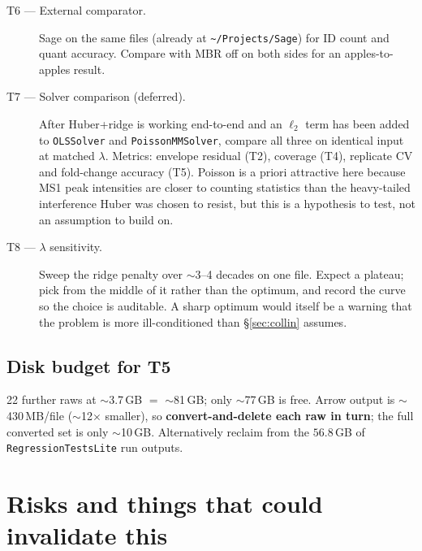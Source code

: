 \documentclass[11pt]{article}
\newcommand{\code}[1]{\texttt{\small #1}}
\begin{document}
\begin{description}
  \item[T6 --- External comparator.] Sage on the same files (already at
        \code{\textasciitilde/Projects/Sage}) for ID count and quant accuracy. Compare with MBR
        off on both sides for an apples-to-apples result.

  \item[T7 --- Solver comparison (deferred).] After Huber+ridge is working end-to-end and an
        $\ell_2$ term has been added to \code{OLSSolver} and \code{PoissonMMSolver}, compare all
        three on identical input at matched $\lambda$. Metrics: envelope residual (T2), coverage
        (T4), replicate CV and fold-change accuracy (T5). Poisson is a priori attractive here
        because MS1 peak intensities are closer to counting statistics than the heavy-tailed
        interference Huber was chosen to resist, but this is a hypothesis to test, not an
        assumption to build on.

  \item[T8 --- $\lambda$ sensitivity.] Sweep the ridge penalty over $\sim$3--4 decades on one
        file. Expect a plateau; pick from the middle of it rather than the optimum, and record
        the curve so the choice is auditable. A sharp optimum would itself be a warning that the
        problem is more ill-conditioned than \S\ref{sec:collin} assumes.
\end{description}

\subsection{Disk budget for T5}
22 further raws at $\sim$3.7\,GB $=$ $\sim$81\,GB; only $\sim$77\,GB is free. Arrow output is
$\sim$430\,MB/file ($\sim$12$\times$ smaller), so \textbf{convert-and-delete each raw in turn};
the full converted set is only $\sim$10\,GB. Alternatively reclaim from the $56.8$\,GB of
\code{RegressionTestsLite} run outputs.

\section{Risks and things that could invalidate this}
\label{sec:risk}
\end{document}
